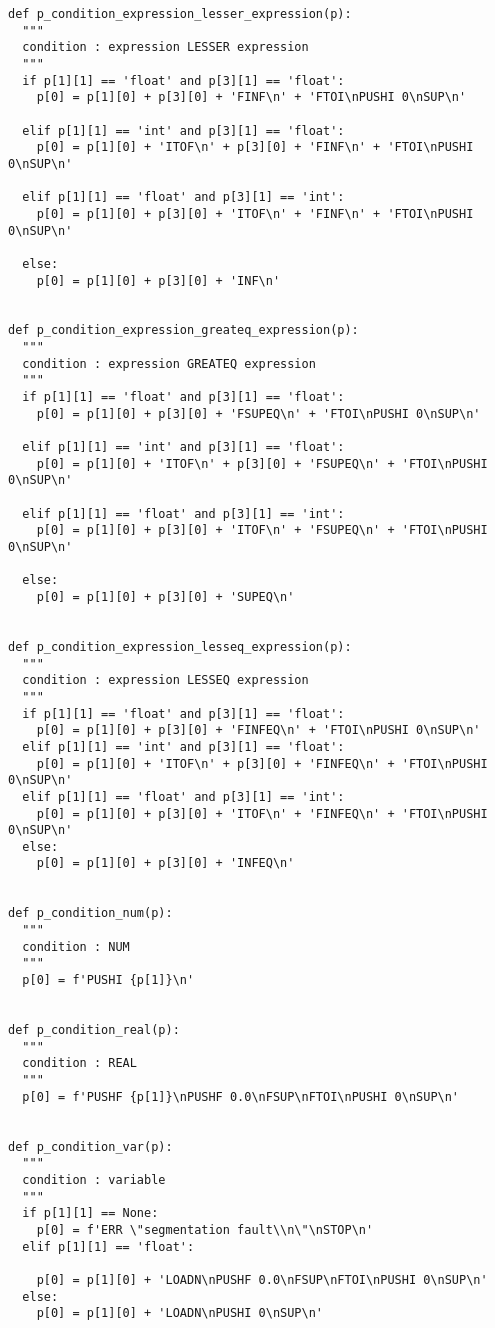 \documentclass[11pt,a4paper]{report}%
\begin{document}
\begin{scriptsize}
\begin{verbatim}
def p_condition_expression_lesser_expression(p):
  """
  condition : expression LESSER expression
  """
  if p[1][1] == 'float' and p[3][1] == 'float':
    p[0] = p[1][0] + p[3][0] + 'FINF\n' + 'FTOI\nPUSHI 0\nSUP\n'

  elif p[1][1] == 'int' and p[3][1] == 'float':
    p[0] = p[1][0] + 'ITOF\n' + p[3][0] + 'FINF\n' + 'FTOI\nPUSHI 0\nSUP\n'
  
  elif p[1][1] == 'float' and p[3][1] == 'int':
    p[0] = p[1][0] + p[3][0] + 'ITOF\n' + 'FINF\n' + 'FTOI\nPUSHI 0\nSUP\n'

  else:
    p[0] = p[1][0] + p[3][0] + 'INF\n'


def p_condition_expression_greateq_expression(p):
  """
  condition : expression GREATEQ expression
  """
  if p[1][1] == 'float' and p[3][1] == 'float':
    p[0] = p[1][0] + p[3][0] + 'FSUPEQ\n' + 'FTOI\nPUSHI 0\nSUP\n'

  elif p[1][1] == 'int' and p[3][1] == 'float':
    p[0] = p[1][0] + 'ITOF\n' + p[3][0] + 'FSUPEQ\n' + 'FTOI\nPUSHI 0\nSUP\n'
  
  elif p[1][1] == 'float' and p[3][1] == 'int':
    p[0] = p[1][0] + p[3][0] + 'ITOF\n' + 'FSUPEQ\n' + 'FTOI\nPUSHI 0\nSUP\n'

  else:
    p[0] = p[1][0] + p[3][0] + 'SUPEQ\n'


def p_condition_expression_lesseq_expression(p):
  """
  condition : expression LESSEQ expression
  """
  if p[1][1] == 'float' and p[3][1] == 'float':
    p[0] = p[1][0] + p[3][0] + 'FINFEQ\n' + 'FTOI\nPUSHI 0\nSUP\n'
  elif p[1][1] == 'int' and p[3][1] == 'float':
    p[0] = p[1][0] + 'ITOF\n' + p[3][0] + 'FINFEQ\n' + 'FTOI\nPUSHI 0\nSUP\n'
  elif p[1][1] == 'float' and p[3][1] == 'int':
    p[0] = p[1][0] + p[3][0] + 'ITOF\n' + 'FINFEQ\n' + 'FTOI\nPUSHI 0\nSUP\n'
  else:
    p[0] = p[1][0] + p[3][0] + 'INFEQ\n'


def p_condition_num(p):
  """
  condition : NUM
  """
  p[0] = f'PUSHI {p[1]}\n'


def p_condition_real(p):
  """
  condition : REAL
  """
  p[0] = f'PUSHF {p[1]}\nPUSHF 0.0\nFSUP\nFTOI\nPUSHI 0\nSUP\n'


def p_condition_var(p):
  """
  condition : variable
  """
  if p[1][1] == None:
    p[0] = f'ERR \"segmentation fault\\n\"\nSTOP\n'
  elif p[1][1] == 'float':
    
    p[0] = p[1][0] + 'LOADN\nPUSHF 0.0\nFSUP\nFTOI\nPUSHI 0\nSUP\n'
  else:
    p[0] = p[1][0] + 'LOADN\nPUSHI 0\nSUP\n'



\end{verbatim}
\end{scriptsize}
\end{document}
